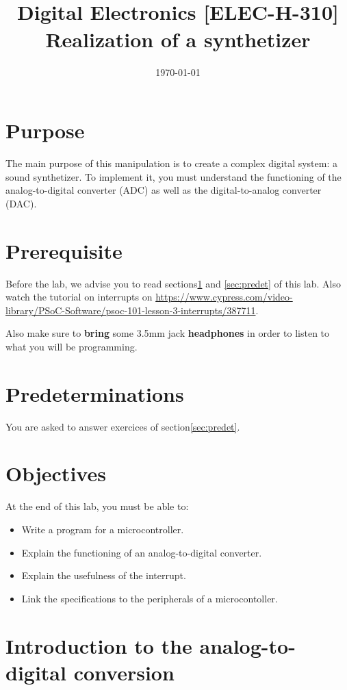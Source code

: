 \documentclass[11pt,a4paper]{article}
\date{\vspace{-1.7cm}\mydate\today}
\title{\vspace{-2cm} \labonumber\\ Digital Electronics [ELEC-H-310]\\Realization of a synthetizer\ifthenelse{\boolean{corrige}}{\\Solution}{}}
\theoremstyle{definition}%
\begin{document}
\pagestyle{empty}
\maketitle
\section*{Purpose}
The main purpose of this manipulation is to create a complex digital system: a sound synthetizer.
To implement it, you must understand the functioning of the analog-to-digital converter (ADC) as well as the digital-to-analog converter (DAC).

\section*{Prerequisite}
Before the lab, we advise you to read sections\ref{sec:intro} and \ref{sec:predet} of this lab. Also watch the tutorial on interrupts on \url{https://www.cypress.com/video-library/PSoC-Software/psoc-101-lesson-3-interrupts/387711}. 

Also make sure to \textbf{bring} some 3.5mm jack \textbf{headphones} in order to listen to what you will be programming.

\section*{Predeterminations}
You are asked to answer exercices of section\ref{sec:predet}.

\section*{Objectives}
At the end of this lab, you must be able to:
\begin{itemize}
	\item Write a program for a microcontroller.
	\item Explain the functioning of an analog-to-digital converter.
	\item Explain the usefulness of the interrupt.
	\item Link the specifications to the peripherals of a microcontoller.
\end{itemize}

\newpage{}

\section{Introduction to the analog-to-digital conversion}
\label{sec:intro}
\end{document}
